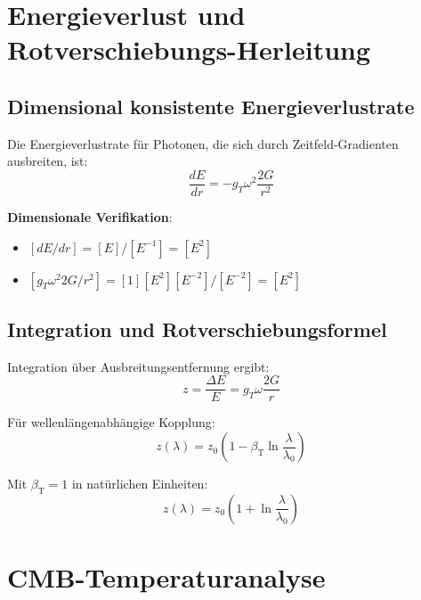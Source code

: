 \documentclass[12pt,a4paper]{article}
\newcommand{\betaT}{\beta_{\text{T}}}
\begin{document}
	\section{Energieverlust und Rotverschiebungs-Herleitung}
	\label{sec:energieverlust}
	
	\subsection{Dimensional konsistente Energieverlustrate}
	\label{subsec:energieverlustrate}
	
	Die Energieverlustrate für Photonen, die sich durch Zeitfeld-Gradienten ausbreiten, ist:
	\begin{equation}
		\frac{dE}{dr} = -g_T \omega^2 \frac{2G}{r^2}
	\end{equation}
	
	\textbf{Dimensionale Verifikation}:
	\begin{itemize}
		\item $[dE/dr] = [E]/[E^{-1}] = [E^2]$
		\item $[g_T \omega^2 2G/r^2] = [1][E^2][E^{-2}]/[E^{-2}] = [E^2]$ \checkmark
	\end{itemize}
	
	\subsection{Integration und Rotverschiebungsformel}
	\label{subsec:rotverschiebungsformel}
	
	Integration über Ausbreitungsentfernung ergibt:
	\begin{equation}
		z = \frac{\Delta E}{E} = g_T \omega \frac{2G}{r}
	\end{equation}
	
	Für wellenlängenabhängige Kopplung:
	\begin{equation}
		z(\lambda) = z_0\left(1 - \betaT \ln\frac{\lambda}{\lambda_0}\right)
	\end{equation}
	
	Mit $\betaT = 1$ in natürlichen Einheiten:
	\begin{equation}
		\boxed{z(\lambda) = z_0\left(1 + \ln\frac{\lambda}{\lambda_0}\right)}
	\end{equation}
	
	\section{CMB-Temperaturanalyse}
	\label{sec:cmb_analyse}
	
\end{document}
